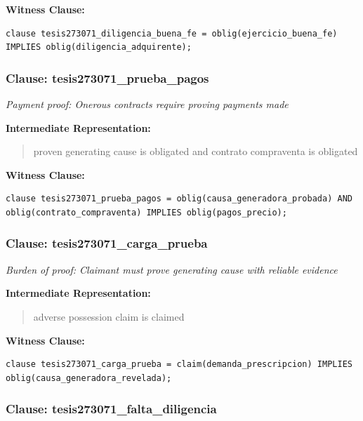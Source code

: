 \documentclass[11pt,a4paper]{article}
\begin{document}
\textbf{Witness Clause:}

\begin{lstlisting}[style=witnessstyle, language=Witness]
clause tesis273071_diligencia_buena_fe = oblig(ejercicio_buena_fe) IMPLIES oblig(diligencia_adquirente);
\end{lstlisting}

\subsubsection{Clause: tesis273071\_prueba\_pagos}

\textit{Payment proof: Onerous contracts require proving payments made}

\textbf{Intermediate Representation:}

\begin{quote}
proven generating cause is obligated and contrato compraventa is obligated
\end{quote}

\textbf{Witness Clause:}

\begin{lstlisting}[style=witnessstyle, language=Witness]
clause tesis273071_prueba_pagos = oblig(causa_generadora_probada) AND oblig(contrato_compraventa) IMPLIES oblig(pagos_precio);
\end{lstlisting}

\subsubsection{Clause: tesis273071\_carga\_prueba}

\textit{Burden of proof: Claimant must prove generating cause with reliable evidence}

\textbf{Intermediate Representation:}

\begin{quote}
adverse possession claim is claimed
\end{quote}

\textbf{Witness Clause:}

\begin{lstlisting}[style=witnessstyle, language=Witness]
clause tesis273071_carga_prueba = claim(demanda_prescripcion) IMPLIES oblig(causa_generadora_revelada);
\end{lstlisting}

\subsubsection{Clause: tesis273071\_falta\_diligencia}
\end{document}

